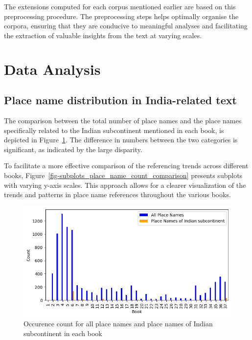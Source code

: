 \documentclass[
  12pt,
]{article}
\begin{document}
The extensions computed for each corpus mentioned earlier are based on
this preprocessing procedure. The preprocessing steps helps optimally
organise the corpora, ensuring that they are conducive to meaningful
analyses and facilitating the extraction of valuable insights from the
text at varying scales.

\hypertarget{data-analysis}{%
\section{Data Analysis}\label{data-analysis}}

\hypertarget{place-name-distribution-in-india-related-text}{%
\subsection{Place name distribution in India-related
text}\label{place-name-distribution-in-india-related-text}}

The comparison between the total number of place names and the place
names specifically related to the Indian subcontinent mentioned in each
book, is depicted in
Figure~\ref{fig-grouped_place_name_count_comparison}. The difference in
numbers between the two categories is significant, as indicated by the
large disparity.

To facilitate a more effective comparison of the referencing trends
across different books,
Figure~\ref{fig-subplots_place_name_count_comparison} presents subplots
with varying y-axis scales. This approach allows for a clearer
visualization of the trends and patterns in place name references
throughout the various books.

\begin{figure}

{\centering \includegraphics{NHthesis_structure_files/figure-pdf/fig-grouped_place_name_count_comparison-output-1.png}

}

\caption{\label{fig-grouped_place_name_count_comparison}Occurence count
for all place names and place names of Indian subcontinent in each book}

\end{figure}
\end{document}
